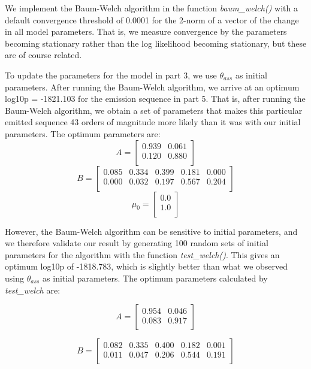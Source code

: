 \documentclass{article}
\begin{document}
We implement the Baum-Welch algorithm in the function \textit{baum\_welch()} with a default convergence threshold of 0.0001 for the 2-norm of a vector of the change in all model parameters. That is, we measure convergence by the parameters becoming stationary rather than the log likelihood becoming stationary, but these are of course related.

To update the parameters for the model in part 3, we use $\theta_{ass}$ as initial parameters. 
After running the Baum-Welch algorithm, we arrive at an optimum log10p = -1821.103 for the emission sequence in part 5.
That is, after running the Baum-Welch algorithm, we obtain a set of parameters that makes this particular emitted sequence 43 orders of magnitude more likely than it was with our initial parameters.
The optimum parameters are:
\[
A = 
\begin{bmatrix}
 0.939 &  0.061\\
 0.120 & 0.880\\
\end{bmatrix}
\]
\[
B = 
\begin{bmatrix}
 0.085 & 0.334  & 0.399 & 0.181 & 0.000\\
 0.000  &    0.032 & 0.197 & 0.567 &  0.204\\
\end{bmatrix}
\]
\[
\mu_0 = 
\begin{bmatrix}
 0.0\\
 1.0\\
\end{bmatrix}
\]

However, the Baum-Welch algorithm can be sensitive to initial parameters, and we therefore validate our result by generating 100 random sets of initial parameters for the algorithm with the function \textit{test\_welch()}. This gives an optimum log10p of -1818.783, which is slightly better than what we observed using $\theta_{ass}$ as initial parameters.
The optimum parameters calculated by \textit{test\_welch} are:

\[
A = 
\begin{bmatrix}
 0.954  &  0.046\\
 0.083  & 0.917\\
\end{bmatrix}
\]

\[
B = 
\begin{bmatrix}
 0.082 &  0.335  & 0.400 & 0.182 & 0.001\\
 0.011 & 0.047 &  0.206  & 0.544 & 0.191\\
\end{bmatrix}
\]
\end{document}
